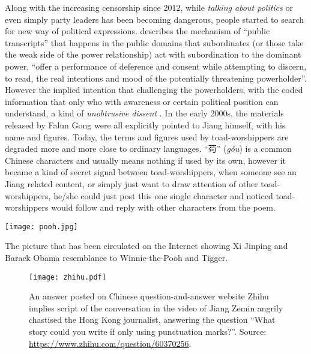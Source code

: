 Along with the increasing censorship since 2012, while \textit{talking about politics} or even simply party leaders has been becoming dangerous, people started to search for new way of political expressions. \citet{scott_behind_1990} describes the mechanism of ``public transcripts'' that happens in the public domains that subordinates (or those take the weak side of the power relationship) act with subordination to the dominant power, ``offer a performance of deference and consent while attempting to discern, to read, the real intentions and mood of the potentially threatening powerholder''. However the implied intention that challenging the powerholders, with the coded information that only who with awareness or certain political position can understand, a kind of \textit{unobtrusive dissent} \citep{perry_studying_2007,esarey_political_2008,scott_behind_1990}. In the early 2000s, the materials released by Falun Gong were all explicitly pointed to Jiang himself, with his name and figures. Today, the terms and figures used by toad-worshippers are degraded more and more close to ordinary languages. ``苟'' (\textit{g\v ou}) is a common Chinese characters and usually means nothing if used by its own, however it became a kind of secret signal between toad-worshippers, when someone see an Jiang related content, or simply just want to draw attention of other toad-worshippers, he/she could just post this one single character and noticed toad-worshippers would follow and reply with other characters from the poem.
\begin{marginfigure}[-12cm]
	\texttt{[image: pooh.jpg]}
	\caption[The picture that has been circulated on the Internet showing Xi Jinping and Barack Obama resemblance to Winnie-the-Pooh and Tigger]{The picture that has been circulated on the Internet showing Xi Jinping and Barack Obama resemblance to Winnie-the-Pooh and Tigger.
		\label{fig:winnie}}
\end{marginfigure}

\begin{figure}[!htbp]
	\centering
	\texttt{[image: zhihu.pdf]}
	\caption[An answer posted on Chinese question-and-answer website Zhihu implies script of the conversation in the video of Jiang Zemin angrily chastised the Hong Kong journalist]{An answer posted on Chinese question-and-answer website Zhihu implies script of the conversation in the video of Jiang Zemin angrily chastised the Hong Kong journalist, answering the question ``What story could you write if only using punctuation marks?''. Source: \url{https://www.zhihu.com/question/60370256}.}
	\label{fig:zhihu}
\end{figure}

